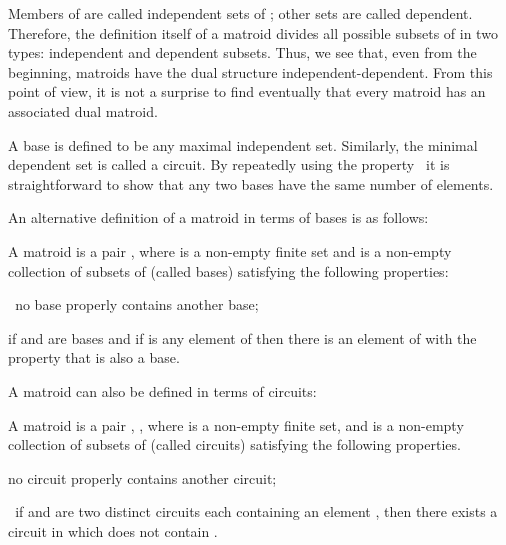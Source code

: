 \documentclass[a4paper,12pt]{article}
\begin{document}
Members of \coordHE{} are called independent sets of \coordHE{}; other sets are called
dependent. Therefore, the definition itself of a matroid divides all
possible subsets of \coordHE{} in two types: independent and dependent subsets.
Thus, we see that, even from the beginning, matroids have the dual structure
independent-dependent. From this point of view, it is not a surprise to find
eventually that every matroid has an associated dual matroid.

A base is defined to be any maximal independent set. Similarly, the minimal
dependent set is called a circuit. By repeatedly using the property \coordHE{}\textit{\ }it is straightforward to show that any two bases
have the same number of elements.

An alternative definition of a matroid in terms of bases is as follows:

A matroid \coordHE{} is a pair \coordHE{}, where \coordHE{} is a non-empty finite
set and \coordHE{} is a non-empty collection of subsets of \coordHE{} (called
bases) satisfying the following properties:

\coordHE{}  \coordHE{}\textit{\ }no base properly contains another
base;

\coordHE{}  \coordHE{} if \coordHE{} and \coordHE{} are bases and if \coordHE{} is
any element of \coordHE{} then there is an element \coordHE{} of \coordHE{} with the
property that \coordHE{} is also a base.

A matroid can also be defined in terms of circuits:

A matroid \coordHE{} is a pair \coordHE{}, \coordHE{}, where \coordHE{} is a non-empty finite set, and 
\coordHE{} is a non-empty collection of subsets of \coordHE{} (called circuits) satisfying
the following properties.

\coordHE{}  \coordHE{} no circuit properly contains another circuit;

\coordHE{}  \coordHE{}\textit{\ }if \coordHE{} and \coordHE{} are two distinct
circuits each containing an element \coordHE{}, then there exists a circuit in \coordHE{} which does not contain \coordHE{}.
\end{document}
